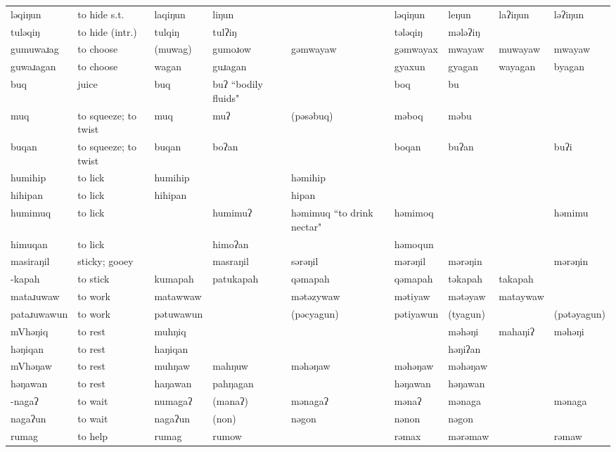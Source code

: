 \begin{landscape}
\begin{longtable}{*{9}{p{}}}
\text{*}ləqiŋun & to hide s.t. & laqiŋun & liŋun &  & ləqiŋun & leŋun & laʔiŋun & ləʔiŋun\\
\text{*}tuləqiŋ & to hide (intr.) & tulqiŋ & tulʔiŋ &  & tələqiŋ & mələʔiŋ &  & \\
\text{*}gumuwaɹag & to choose & (muwag) & gumoɹow & gəmwayaw & gəmwayax & mwayaw & muwayaw & mwayaw\\
\text{*}guwaɹagan & to choose & wagan & guɹagan &  & gyaxun & gyagan & wayagan & byagan\\
\text{*}buq & juice & buq & buʔ ``bodily fluids" &  & boq & bu &  & \\
\text{*}muq & to squeeze; to twist & muq & muʔ & (pəsəbuq) & məboq & məbu &  & \\
\text{*}buqan & to squeeze; to twist & buqan & boʔan &  & boqan & buʔan &  & buʔi\\
\text{*}humihip & to lick & humihip &  & həmihip &  &  &  & \\
\text{*}hihipan & to lick & hihipan &  & hipan &  &  &  & \\
\text{*}humimuq & to lick &  & humimuʔ & həmimuq ``to drink nectar" & həmimoq &  &  & həmimu\\
\text{*}himuqan & to lick &  & himoʔan &  & həmoqun &  &  & \\
\text{*}masiraŋil & sticky; gooey &  & masraŋil & sərəŋil & mərəŋil & mərəŋin &  & mərəŋin\\
\text{*}-kapah & to stick & kumapah & patukapah & qəmapah & qəmapah & təkapah & takapah & \\
\text{*}mataɹuwaw & to work & matawwaw &  & mətəzywaw & mətiyaw & mətəyaw & mataywaw & \\
\text{*}pataɹuwawun & to work & pətuwawun &  & (pəcyagun) & pətiyawun & (tyagun) &  & (pətəyagun)\\
\text{*}mVhəŋiq & to rest & muhŋiq &  &  &  & məhəŋi & mahaŋiʔ & məhəŋi\\
\text{*}həŋiqan & to rest & haŋiqan &  &  &  & həŋiʔan &  & \\
\text{*}mVhəŋaw & to rest & muhŋaw & mahŋuw & məhəŋaw & məhəŋaw & məhəŋaw &  & \\
\text{*}həŋawan & to rest & haŋawan & pahŋagan &  & həŋawan & həŋawan &  & \\
\text{*}-nagaʔ & to wait & numagaʔ & (manaʔ) & mənagaʔ & mənaʔ & mənaga &  & mənaga\\
\text{*}nagaʔun & to wait & nagaʔun & (non) & nəgon & nənon & nəgon &  & \\
\text{*}rumag & to help & rumag & rumow &  & rəmax & mərəmaw &  & rəmaw\\

\end{longtable}
\end{landscape}
